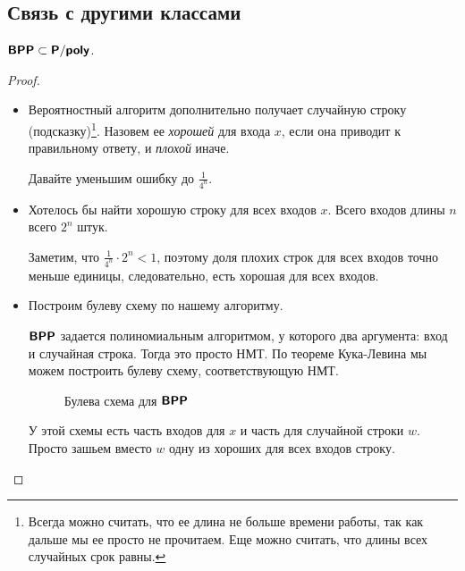 \subsection{Связь с другими классами}
\begin{thm}
	$ \textmd{\textbf{\textsf{BPP}}} \subset \textmd{\textbf{\textsf{P}}}/\textmd{\textbf{\textsf{poly}}}$.
\end{thm}
\begin{proof}
	\begin{itemize}
		\item
			Вероятностный алгоритм дополнительно получает случайную строку (подсказку)\footnote{Всегда можно считать, что ее длина не больше времени работы, так как дальше мы ее просто не прочитаем.
			Еще можно считать, что длины всех случайных срок равны.}.
			Назовем ее \textit{хорошей} для входа $ x$, если она приводит к правильному ответу, и \textit{плохой} иначе.

			Давайте уменьшим ошибку до $ \frac{1}{4^{n}}$. %

		\item
			Хотелось бы найти хорошую строку для всех входов $ x$. Всего входов длины $ n$ всего $ 2^{n}$ штук.

			Заметим, что $ \frac{1}{4^{n}} \cdot 2^{n} < 1$, поэтому доля плохих строк для всех входов точно меньше единицы, следовательно, есть хорошая для всех входов.

		\item
			Построим булеву схему по нашему алгоритму.

			$ \textmd{\textbf{\textsf{BPP}}}$ задается полиномиальным алгоритмом, у которого два аргумента: вход и случайная строка.
			Тогда это просто НМТ. По теореме Кука-Левина мы можем построить булеву схему, соответствующую НМТ.
			\begin{figure}[ht]
				\centering
				\caption{Булева схема для $ \textmd{\textbf{\textsf{BPP}}}$}
				\label{fig:random-bpp}
			\end{figure}
			У этой схемы есть часть входов для $ x$ и часть для случайной строки $ w$. Просто зашьем вместо  $ w$ одну из хороших для всех входов строку.
	\end{itemize}
\end{proof}

